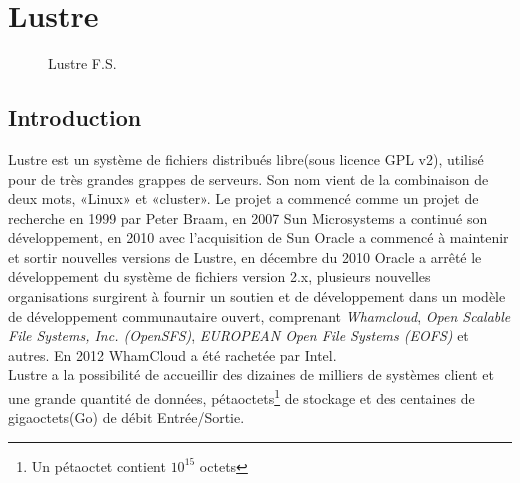 \documentclass[12pt]{article}
\begin{document}
	
  
\newpage
\section{Lustre}
\begin{figure}[H] 
\caption{Lustre F.S.}
\label{fig:speciation}
\end{figure}

\subsection{Introduction}
Lustre est un système de fichiers distribués libre(sous licence GPL v2), utilisé pour de très grandes grappes de serveurs. Son nom vient de la combinaison de deux mots, «Linux» et «cluster». Le projet a commencé comme un projet de recherche en 1999 par Peter Braam, en 2007 Sun Microsystems a continué son développement, en 2010 avec l'acquisition de Sun Oracle a commencé à maintenir et sortir nouvelles versions de Lustre, en décembre du 2010 Oracle a arrêté le développement du système de fichiers version 2.x, plusieurs nouvelles organisations surgirent à fournir un soutien et de développement dans un modèle de développement communautaire ouvert, comprenant \textit{Whamcloud}, \textit{Open Scalable File Systems, Inc. (OpenSFS)}, \textit{EUROPEAN Open File Systems (EOFS)} et autres. En 2012 WhamCloud a été rachetée par Intel.\\


Lustre a la possibilité de accueillir des dizaines de milliers de systèmes client et une grande quantité de données, pétaoctets\footnote{Un pétaoctet contient \begin{math}10^{15}\end{math} octets} de stockage et des centaines de gigaoctets(Go) de débit Entrée/Sortie. 
\end{document}
